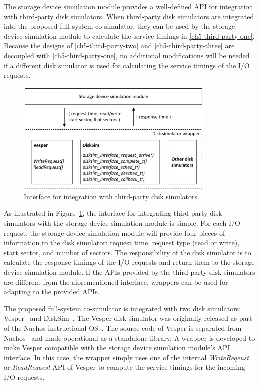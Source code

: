 The storage device simulation module provides a well-defined API for integration with third-party disk simulators. When third-party disk simulators are integrated into the proposed full-system co-simulator, they can be used by the storage device simulation module to calculate the service timings in \ref{ch5-third-party-one}. Because the designs of \ref{ch5-third-party-two} and \ref{ch5-third-party-three} are decoupled with \ref{ch5-third-party-one}, no additional modifications will be needed if a different disk simulator is used for calculating the service timings of the I/O requests.

\begin{figure}[htpb!]
	\centering
	\includegraphics[width=0.85\textwidth]{figures/ch5-disk-simulator-integration.pdf}
	\caption{\label{fig:ch5-disk-simulator-integration}Interface for integration with third-party disk simulators.}
\end{figure}

As illustrated in Figure~\ref{fig:ch5-disk-simulator-integration}, the interface for integrating third-party disk simulators with the storage device simulation module is simple. For each I/O request, the storage device simulation module will provide four pieces of information to the disk simulator: request time, request type (read or write), start sector, and number of sectors. The responsibility of the disk simulator is to calculate the response timings of the I/O requests and return them to the storage device simulation module. If the APIs provided by the third-party disk simulators are different from the aforementioned interface, wrappers can be used for adapting to the provided APIs.

The proposed full-system co-simulator is integrated with two disk simulators: Vesper~\cite{DeRosa:2006} and DiskSim~\cite{Bucy:2008}. The Vesper disk simulator was originally released as part of the Nachos instructional OS~\cite{Christopher:1993}. The source code of Vesper is separated from Nachos~\cite{Pearson:2007} and made operational as a standalone library. A wrapper is developed to make Vesper compatible with the storage device simulation module's API interface. In this case, the wrapper simply uses one of the internal \textit{WriteReqeust} or \textit{ReadRequest} API of Vesper to compute the service timings for the incoming I/O requests.

